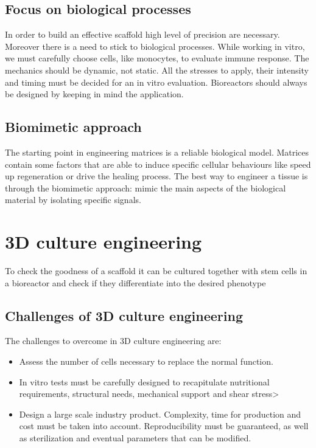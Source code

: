 	\subsection{Focus on biological processes}
	In order to build an effective scaffold high level of precision are necessary.
	Moreover there is a need to stick to biological processes.
	While working in vitro, we must carefully choose cells, like monocytes, to evaluate immune response.
	The mechanics should be dynamic, not static.
	All the stresses to apply, their intensity and timing must be decided for an in vitro evaluation.
	Bioreactors should always be designed by keeping in mind the application.

	\subsection{Biomimetic approach}
	The starting point in engineering matrices is a reliable biological model.
	Matrices contain some factors that are able to induce specific cellular behaviours like speed up regeneration or drive the healing process.
	The best way to engineer a tissue is through the biomimetic approach: mimic the main aspects of the biological material by isolating specific signals.

\section{3D culture engineering}
To check the goodness of a scaffold it can be cultured together with stem cells in a bioreactor and check if they differentiate into the desired phenotype

	\subsection{Challenges of 3D culture engineering}
	The challenges to overcome in 3D culture engineering are:

	\begin{multicols}{2}
		\begin{itemize}
			\item Assess the number of cells necessary to replace the normal function.
			\item In vitro tests must be carefully designed to recapitulate nutritional requirements, structural needs, mechanical support and shear stress>
			\item Design a large scale industry product.
				Complexity, time for production and cost must be taken into account.
				Reproducibility must be guaranteed, as well as sterilization and eventual parameters that can be modified.
		\end{itemize}
	\end{multicols}

